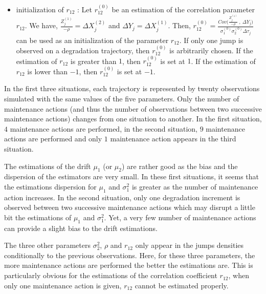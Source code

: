\begin{itemize}
\item initialization of $r_{12}$ :  Let $r_{12}^{(0)}$ be an estimation of the correlation parameter $r_{12}$. We have, $\frac{Z^{(1)}_j}{-\rho}=\Delta X^{(2)}_j$ and $\Delta  Y_j=\Delta X^{(1)}_j$. Then, $r_{12}^{(0)}=\frac{Cov \big(\frac{Z^{(1)}_j}{-\rho}\ ,\ \Delta  Y_j \big)}{\sigma_1^{(0)}\sigma_2^{(0)} \Delta \tau_j}$ can be used as an initialization of the parameter $r_{12}$. If only one jump is observed on a degradation trajectory, then $r_{12}^{(0)}$ is  arbitrarily chosen.  If the estimation of $r_{12}$ is greater than $1$, then $r_{12}^{(0)}$ is set at $1$. If the estimation of $r_{12}$ is lower than $-1$, then $r_{12}^{(0)}$ is set at $-1$.

\end{itemize}



\noindent In the first three situations, each trajectory is represented by twenty observations simulated with the same values of the five parameters. Only the number of maintenance actions (and thus the number of observations between two successive maintenance actions) changes from one situation to another. In the first situation, $4$ maintenance actions are performed, in the second situation, $9$ maintenance actions are performed and only $1$ maintenance action appears in the third situation.

\noindent The estimations of the drift $\mu_1$ (or $\mu_2$) are rather good as the bias and the dispersion of the estimators are very small.
In these first  situations, it seems that the estimations dispersion for $\mu_1$ and $\sigma^2_1$ is greater as the number of maintenance action increases. In the second situation, only one degradation increment is observed between two successive maintenance actions which may disrupt a little bit the estimations of $\mu_1$ and $\sigma_1^2$.  Yet, a very few number of maintenance actions can provide a  slight bias to the drift estimations.

\noindent The three other parameters $\sigma_2^2$, $\rho$ and $r_{12}$ only appear in the jumps densities conditionally to the previous observations. Here, for these three parameters, the more maintenance actions are performed the better the estimations are. This is particularly obvious for the estimations of the correlation coefficient $r_{12}$, when only one maintenance action is given, $r_{12}$ cannot be estimated properly. 

